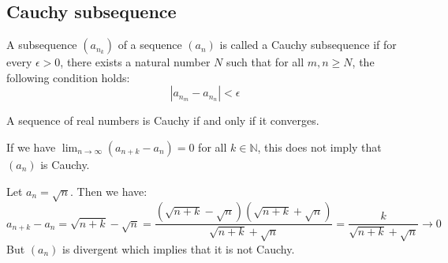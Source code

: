 \subsection{Cauchy subsequence}
\begin{definition}
    A subsequence \( (a_{n_k}) \) of a sequence \( (a_n) \) is called a Cauchy subsequence if for every \( \epsilon > 0 \), there exists a natural number \( N \) such that for all \( m, n \geq N \), the following condition holds:
    \[ |a_{n_m} - a_{n_n}| < \epsilon \]
\end{definition}
\begin{theorem}
    A sequence of real numbers is Cauchy if and only if it converges.
\end{theorem}
If we have $\lim_{n \to \infty} (a_{n + k} - a_n) = 0$ for all $k \in \mathbb{N}$, this does not imply that $(a_n)$ is Cauchy.
\begin{eg}
    Let $a_n = \sqrt{n}$. Then we have:
    \[ a_{n + k} - a_n = \sqrt{n + k} - \sqrt{n} = \frac{(\sqrt{n + k} - \sqrt{n})(\sqrt{n + k} + \sqrt{n})}{\sqrt{n + k} + \sqrt{n}} = \frac{k}{\sqrt{n + k} + \sqrt{n}} \to 0 \]
    But $(a_n)$ is divergent which implies that it is not Cauchy. \\
\end{eg}

